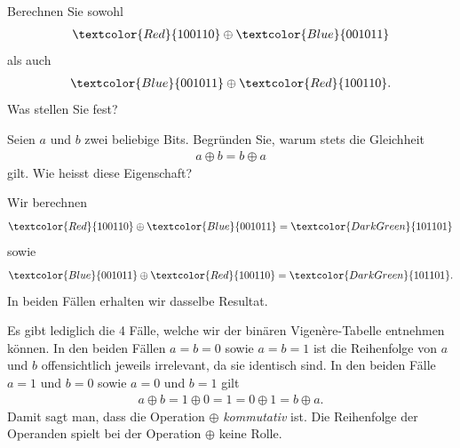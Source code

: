\begin{myexercise}
	\begin{aenum}
		\item Berechnen Sie sowohl
		\begin{align*}
			\textcolor{Red}{100110}\oplus \textcolor{Blue}{001011}
		\end{align*}
		als auch
		\begin{align*}
			\textcolor{Blue}{001011}\oplus \textcolor{Red}{100110}.
		\end{align*}
		Was stellen Sie fest?
		\item Seien $a$ und $b$ zwei beliebige Bits. Begründen Sie, warum stets die Gleichheit
		\begin{align*}
			a\oplus b = b\oplus a
		\end{align*}
		gilt. Wie heisst diese Eigenschaft?
	\end{aenum}
	\begin{myanswer}
		\begin{aenum}
			\item Wir berechnen
			\begin{align*}
				\textcolor{Red}{100110}\oplus \textcolor{Blue}{001011} = \textcolor{DarkGreen}{101101}
			\end{align*}
			sowie
			\begin{align*}
				\textcolor{Blue}{001011}\oplus \textcolor{Red}{100110} = \textcolor{DarkGreen}{101101}.
			\end{align*}
			In beiden Fällen erhalten wir dasselbe Resultat.
			\item Es gibt lediglich die 4 Fälle, welche wir der binären Vigenère-Tabelle entnehmen können. In den beiden Fällen $a = b = 0$ sowie $a = b = 1$ ist die Reihenfolge von $a$ und $b$ offensichtlich jeweils irrelevant, da sie identisch sind. In den beiden Fälle $a = 1$ und $b = 0$ sowie $a = 0$ und $b =1$ gilt
			\begin{align*}
				a\oplus b = 1\oplus 0 = 1 = 0\oplus 1 = b\oplus a.
			\end{align*}
			Damit sagt man, dass die Operation $\oplus$ \textit{kommutativ} ist. Die Reihenfolge der Operanden spielt bei der Operation $\oplus$ keine Rolle.
		\end{aenum}
	\end{myanswer}
\end{myexercise}

